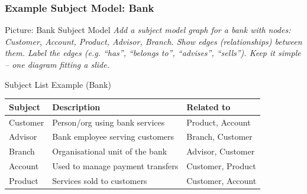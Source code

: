 \begin{frame}
  \frametitle{Example Subject Model: Bank}

  \begin{alertblock}{Picture: Bank Subject Model}
    \textit{Add a subject model graph for a bank with nodes: Customer, Account,
    Product, Advisor, Branch. Show edges (relationships) between them.
    Label the edges (e.g. ``has'', ``belongs to'', ``advises'', ``sells'').
    Keep it simple -- one diagram fitting a slide.}
  \end{alertblock}

  \begin{block}{Subject List Example (Bank)}
    \begin{tabularx}{\linewidth}{@{}l X l@{}}
      \toprule
      \textbf{Subject} & \textbf{Description} & \textbf{Related to} \\
      \midrule
      Customer  & Person/org using bank services & Product, Account \\
      Advisor   & Bank employee serving customers & Branch, Customer \\
      Branch    & Organisational unit of the bank & Advisor, Customer \\
      Account   & Used to manage payment transfers & Customer, Product \\
      Product   & Services sold to customers & Customer, Account \\
      \bottomrule
    \end{tabularx}
  \end{block}
\end{frame}


